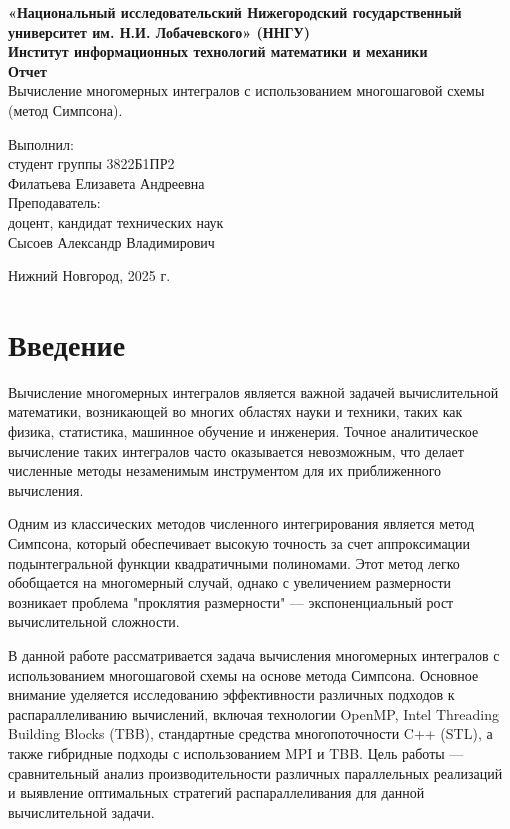 \documentclass[12pt]{article}
\begin{document}
\thispagestyle{empty}
\begin{center}
    {\bfseries
    {\large «Национальный исследовательский Нижегородский государственный университет им.
Н.И. Лобачевского» (ННГУ) }\\[2em]
    {\large Институт информационных технологий математики и механики }\\[1em]
    }
    \vspace*{\fill} 
    {\LARGE\bfseries Отчет}\\[1em]
    {\large Вычисление многомерных интегралов с использованием многошаговой схемы (метод Симпсона).}\\[5em]
    \vspace{\fill} 
     \hfill\parbox{0.4\textwidth}{
        Выполнил:\\
        студент группы 3822Б1ПР2\\
        Филатьева Елизавета Андреевна\\[2em]
        Преподаватель:\\
        доцент, кандидат технических наук\\
        Сысоев Александр Владимирович\\[2em]
    }

    Нижний Новгород, 2025 г.
\end{center}
\newpage

\tableofcontents
\newpage

\section{Введение}
Вычисление многомерных интегралов является важной задачей вычислительной математики, возникающей во многих областях науки и техники, таких как физика, статистика, машинное обучение и инженерия. Точное аналитическое вычисление таких интегралов часто оказывается невозможным, что делает численные методы незаменимым инструментом для их приближенного вычисления.

Одним из классических методов численного интегрирования является метод Симпсона, который обеспечивает высокую точность за счет аппроксимации подынтегральной функции квадратичными полиномами. Этот метод легко обобщается на многомерный случай, однако с увеличением размерности возникает проблема "проклятия размерности" — экспоненциальный рост вычислительной сложности.

В данной работе рассматривается задача вычисления многомерных интегралов с использованием многошаговой схемы на основе метода Симпсона. Основное внимание уделяется исследованию эффективности различных подходов к распараллеливанию вычислений, включая технологии OpenMP, Intel Threading Building Blocks (TBB), стандартные средства многопоточности C++ (STL), а также гибридные подходы с использованием MPI и TBB. Цель работы — сравнительный анализ производительности различных параллельных реализаций и выявление оптимальных стратегий распараллеливания для данной вычислительной задачи.
\end{document}
